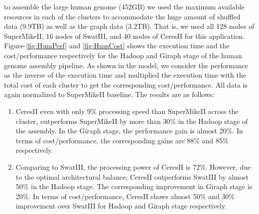\documentclass[journal]{IEEEtran}
\begin{document}
to assemble the large human genome (452GB) we used the maximum available resources in each of the clusters to accommodate the huge amount of shuffled data (9.9TB) as well as the graph data (3.2TB). That is, we used all 128 nodes of SuperMikeII, 16 nodes of SwatIII, and 40 nodes of CeresII for this application. Figure-\ref{fig:HumPerf} and \ref{fig:HumCost} shows the execution time and the cost/performance respectively for the Hadoop and Giraph stage of the human genome assembly pipeline. As shown in the model, we consider the performance as the inverse of the execution time and multiplied the execution time with the total cost of each cluster to get the corresponding cost/performance. All data is again normalized to SuperMikeII baseline. The results are as follows:
\begin{enumerate}
\item CeresII even with only 9\% processing speed than SuperMikeII across the cluster, outperforms SuperMikeII by more than 30\% in the Hadoop stage of the assembly. In the Giraph stage, the performance gain is almost 20\%. In terms of cost/performance, the corresponding gains are 88\% and 85\% respectively. 
\item Comparing to SwatIII,  the processing power of CeresII is 72\%. However,  due to the optimal architectural balance, CeresII outperforms SwatIII by almost 50\% in the Hadoop stage. The corresponding improvement in Giraph stage is 20\%. In terms of cost/performance, CeresII shows almost 50\% and 30\% improvement over SwatIII for Hadoop and Giraph stage respectively.
\end{enumerate}

%
%
\end{document}
